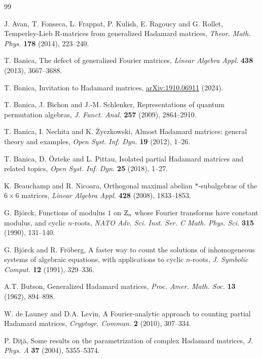 \documentclass[11pt,a4paper]{article}
\theoremstyle{plain}
\theoremstyle{definition}
\numberwithin{equation}{section}
\begin{document}
\begingroup
\color{black}
\hypersetup{allcolors=black}
\linespread{0.85}\selectfont
\begin{thebibliography}{99}

 J. Avan, T. Fonseca, L. Frappat, P. Kulish, E. Ragoucy and G. Rollet, Temperley-Lieb R-matrices from generalized Hadamard matrices, {\em Theor. Math. Phys.} {\bf 178} (2014), 223--240.

 T. Banica, The defect of generalized Fourier matrices, {\em Linear Algebra Appl.} {\bf 438} (2013), 3667--3688.

 T. Banica, Invitation to Hadamard matrices, {\hypersetup{allcolors=black}\href{https://arxiv.org/abs/1910.06911}{arXiv:1910.06911}} (2024).

 T. Banica, J. Bichon and J.-M. Schlenker, Representations of quantum permutation algebras, {\em J. Funct. Anal.} {\bf 257} (2009), 2864--2910.

 T. Banica, I. Nechita and K. \.Zyczkowski, Almost Hadamard matrices: general theory and examples, {\em Open Syst. Inf. Dyn.} {\bf 19} (2012), 1--26.

 T. Banica, D. \"Ozteke and L. Pittau, Isolated partial Hadamard matrices and related topics, {\em Open Syst. Inf. Dyn.} {\bf 25} (2018), 1--27.

 K. Beauchamp and R. Nicoara, Orthogonal maximal abelian $*$-subalgebras of the $6\times 6$ matrices, {\em Linear Algebra Appl.} {\bf 428} (2008), 1833--1853.

 G. Bj\"orck, Functions of modulus $1$ on ${\rm Z}_n$ whose Fourier transforms have constant modulus, and cyclic $n$-roots, {\em NATO Adv. Sci. Inst. Ser. C Math. Phys. Sci.} {\bf 315} (1990), 131--140.

 G. Bj\"orck and R. Fr\"oberg, A faster way to count the solutions of inhomogeneous systems of algebraic equations, with applications to cyclic $n$-roots, {\em J. Symbolic Comput.} {\bf 12} (1991), 329--336.

 A.T. Butson, Generalized Hadamard matrices, {\em Proc. Amer. Math. Soc.} {\bf 13} (1962), 894--898.

 W. de Launey and D.A. Levin, A Fourier-analytic approach to counting partial Hadamard matrices, {\em Cryptogr. Commun.} {\bf 2} (2010), 307--334.

 P. Di\c t\u a, Some results on the parametrization of complex Hadamard matrices, {\em J. Phys. A} {\bf 37} (2004), 5355--5374.


\end{thebibliography}
\end{document}
